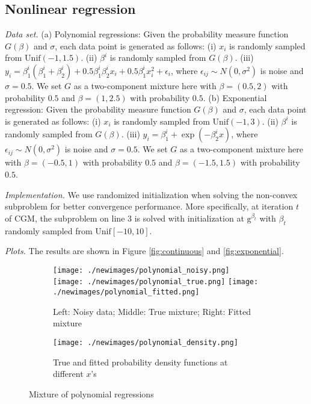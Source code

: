 \documentclass[11pt]{article}
\numberwithin{equation}{section}
\newcommand{\gv}{\mathrm{g}}
\begin{document}
\subsection{Nonlinear regression}
\label{section:nonlinear}
\emph{Data set.} (a) Polynomial regressions: Given the probability measure function $G(\beta)$ and $\sigma$, each data point is generated as follows: (i) $x_i$ is randomly sampled from $\mathrm{Unif}(-1,1.5)$. (ii) $\beta^i$ is randomly sampled from $G(\beta)$. (iii) $y_i = \beta^i_1(\beta^i_1+\beta^i_2) +0.5 \beta^i_1\beta^i_2 x_i +0.5\beta^i_1x_i^2+\epsilon_i$, where $\epsilon_{ij} \sim N(0,\sigma^2)$ is noise and $\sigma =0.5$. We set $G$ as a two-component mixture here with $\beta = (0.5,2)$ with probability $0.5$ and $\beta = (1,2.5)$ with probability $0.5$. (b) Exponential regression: Given the probability measure function $G(\beta)$ and $\sigma$, each data point is generated as follows: (i) $x_i$ is randomly sampled from $\mathrm{Unif}(-1,3)$. (ii) $\beta^i$ is randomly sampled from $G(\beta)$. (iii) $y_i = \beta^i_1 + \exp(-\beta^i_2 x)$, where $\epsilon_{ij} \sim N(0,\sigma^2)$ is noise and $\sigma =0.5$. We set $G$ as a two-component mixture here with $\beta = (-0.5,1)$ with probability $0.5$ and $\beta = (-1.5,1.5)$ with probability $0.5$.


\emph{Implementation. } We use randomized initialization when solving the non-convex subproblem for better convergence performance. More specifically, at iteration $t$ of CGM, the subproblem on line 3 is solved with initialization at $\gv^{\beta_t}$ with $\beta_t$ randomly sampled from $\mathrm{Unif}[-10,10]$. 

\emph{Plots. } The results are shown in Figure \ref{fig:continuous} and \ref{fig:exponential}.

\begin{figure}[!htbp]
\begin{subfigure}[b]{\textwidth}
\texttt{[image: ./newimages/polynomial\_noisy.png]}
\texttt{[image: ./newimages/polynomial\_true.png]}
\texttt{[image: ./newimages/polynomial\_fitted.png]}
\caption{Left: Noisy data; Middle: True mixture; Right: Fitted mixture}
\end{subfigure}

\begin{subfigure}[b]{\textwidth}
\texttt{[image: ./newimages/polynomial\_density.png]}
\caption{True and fitted probability density functions at different $x$'s }
\end{subfigure}
\caption{Mixture of polynomial regressions}
\label{fig:polynomial}
\end{figure}
\end{document}
